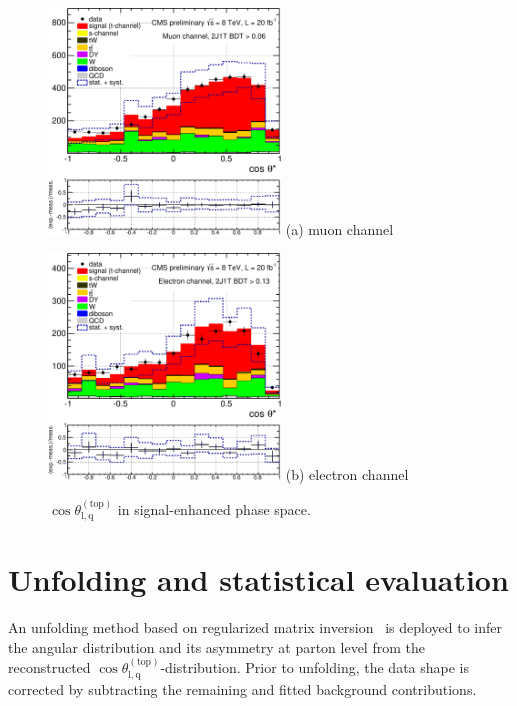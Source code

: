 \documentclass[a4paper]{jpconf}
\newcommand{\costheta}[0]{\cos\theta_{\mathrm{l,q}}^{\mathrm{(top)}}}
\begin{document}
\begin{figure}[h]
\begin{center}
\begin{minipage}{7cm}
\includegraphics[height=6.0cm]{2j1t_cosTheta_mu-crop}
\center (a) muon channel
\end{minipage}\hspace{1cm}%
\begin{minipage}{7cm}
\includegraphics[height=6.0cm]{2j1t_cosTheta_el-crop}
\center (b) electron channel
\end{minipage} 
\caption{\label{fig:recocostheta}$\costheta$ in signal-enhanced phase space.}
\end{center}
\end{figure}


\section{Unfolding and statistical evaluation}
An unfolding method based on regularized matrix inversion~\cite{tunfold} is deployed to infer the angular distribution and its asymmetry at parton level from the reconstructed $\costheta$-distribution. Prior to unfolding, the data shape is corrected by subtracting the remaining and fitted background contributions.
\end{document}
